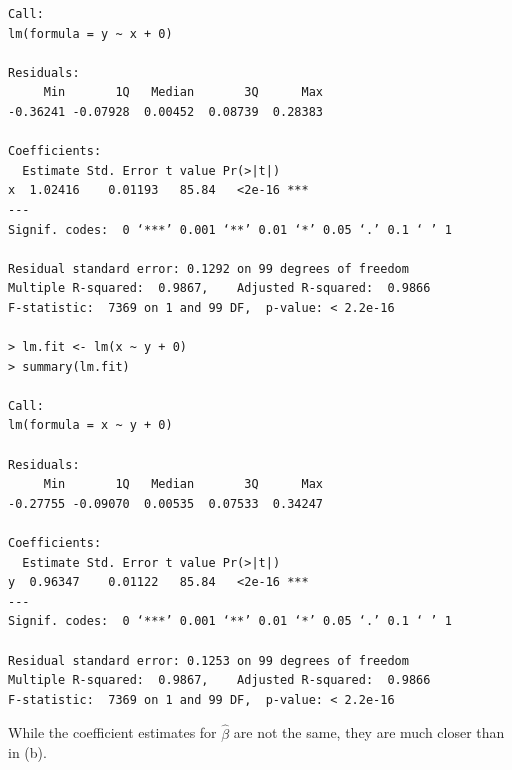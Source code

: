 \begin{itemize}
\begin{lstlisting}
Call:
lm(formula = y ~ x + 0)

Residuals:
     Min       1Q   Median       3Q      Max
-0.36241 -0.07928  0.00452  0.08739  0.28383

Coefficients:
  Estimate Std. Error t value Pr(>|t|)
x  1.02416    0.01193   85.84   <2e-16 ***
---
Signif. codes:  0 ‘***’ 0.001 ‘**’ 0.01 ‘*’ 0.05 ‘.’ 0.1 ‘ ’ 1

Residual standard error: 0.1292 on 99 degrees of freedom
Multiple R-squared:  0.9867,    Adjusted R-squared:  0.9866
F-statistic:  7369 on 1 and 99 DF,  p-value: < 2.2e-16

> lm.fit <- lm(x ~ y + 0)
> summary(lm.fit)

Call:
lm(formula = x ~ y + 0)

Residuals:
     Min       1Q   Median       3Q      Max
-0.27755 -0.09070  0.00535  0.07533  0.34247

Coefficients:
  Estimate Std. Error t value Pr(>|t|)
y  0.96347    0.01122   85.84   <2e-16 ***
---
Signif. codes:  0 ‘***’ 0.001 ‘**’ 0.01 ‘*’ 0.05 ‘.’ 0.1 ‘ ’ 1

Residual standard error: 0.1253 on 99 degrees of freedom
Multiple R-squared:  0.9867,    Adjusted R-squared:  0.9866
F-statistic:  7369 on 1 and 99 DF,  p-value: < 2.2e-16
        \end{lstlisting}
        While the coefficient estimates for $\hat{\beta}$ are not the
        same, they are much closer than in (b).
\end{itemize}
